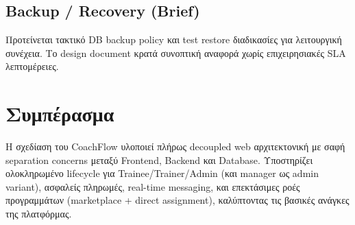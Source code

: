 \documentclass[12pt,a4paper]{report}
\begin{document}
\subsection{Backup / Recovery (Brief)}
Προτείνεται τακτικό DB backup policy και test restore διαδικασίες για λειτουργική συνέχεια. Το design document κρατά συνοπτική αναφορά χωρίς επιχειρησιακές SLA λεπτομέρειες.

\newpage

\section{Συμπέρασμα}
Η σχεδίαση του CoachFlow υλοποιεί πλήρως decoupled web αρχιτεκτονική με σαφή separation concerns μεταξύ Frontend, Backend και Database. Υποστηρίζει ολοκληρωμένο lifecycle για Trainee/Trainer/Admin (και manager ως admin variant), ασφαλείς πληρωμές, real-time messaging, και επεκτάσιμες ροές προγραμμάτων (marketplace + direct assignment), καλύπτοντας τις βασικές ανάγκες της πλατφόρμας.
\end{document}
